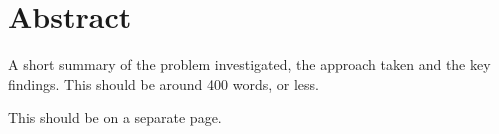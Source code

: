 \chapter*{Abstract}
A short summary of the problem investigated, the approach taken and the key findings. This should be around 400 words, or less.

This should be on a separate page.